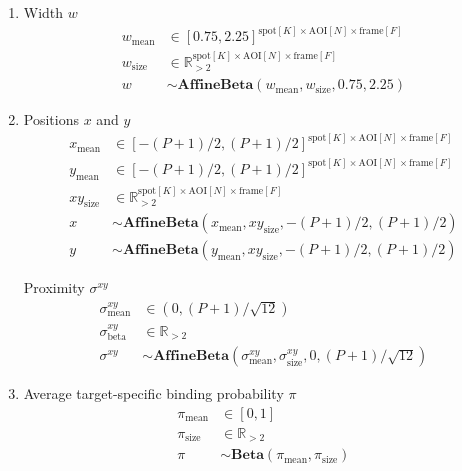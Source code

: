 \begin{enumerate}
\item Width $w$
\begin{subequations}
\begin{align}
    w_\mathrm{mean} &\in [0.75, 2.25]^{\mathrm{spot}[K] \times \mathrm{AOI}[N] \times \mathrm{frame}[F]} \\
    w_\mathrm{size} &\in \mathbb{R}_{>2}^{\mathrm{spot}[K] \times \mathrm{AOI}[N] \times \mathrm{frame}[F]} \\
    w &\sim \mathbf{AffineBeta}(w_\mathrm{mean}, w_\mathrm{size}, 0.75, 2.25)
\end{align}
\end{subequations}

\item Positions $x$ and $y$
\begin{subequations}
\begin{align}
    x_\mathrm{mean} &\in [-(P+1)/2, (P+1)/2]^{\mathrm{spot}[K] \times \mathrm{AOI}[N] \times \mathrm{frame}[F]} \\
    y_\mathrm{mean} &\in [-(P+1)/2, (P+1)/2]^{\mathrm{spot}[K] \times \mathrm{AOI}[N] \times \mathrm{frame}[F]} \\
    xy_\mathrm{size} &\in \mathbb{R}_{>2}^{\mathrm{spot}[K] \times \mathrm{AOI}[N] \times \mathrm{frame}[F]} \\
    x &\sim \mathbf{AffineBeta} \left( x_\mathrm{mean}, xy_\mathrm{size}, -(P+1)/2, (P+1)/2 \right) \\
    y &\sim \mathbf{AffineBeta} \left( y_\mathrm{mean}, xy_\mathrm{size}, -(P+1)/2, (P+1)/2 \right)
\end{align}
\end{subequations}

Proximity $\sigma^{xy}$
\begin{subequations}
\begin{align}
    \sigma^{xy}_\mathrm{mean} &\in (0, (P+1) / \sqrt{12}) \\
    \sigma^{xy}_\mathrm{beta} &\in \mathbb{R}_{>2} \\
    \sigma^{xy} &\sim \mathbf{AffineBeta}(\sigma^{xy}_\mathrm{mean}, \sigma^{xy}_\mathrm{size}, 0, (P+1) / \sqrt{12})
\end{align}
\end{subequations}

\item Average target-specific binding probability $\pi$
\begin{subequations}
\begin{align}
    \pi_\mathrm{mean} &\in [0, 1] \\
    \pi_\mathrm{size} &\in \mathbb{R}_{>2} \\
    \pi &\sim \mathbf{Beta}(\pi_\mathrm{mean}, \pi_\mathrm{size})
\end{align}
\end{subequations}


\end{enumerate}
